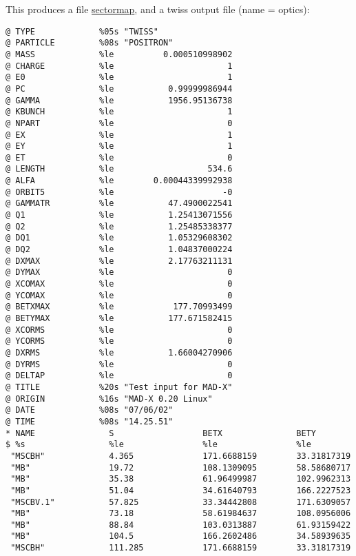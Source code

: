 This produces a file \href{sectormap.html}{sectormap}, and a
\href{tfs}{}twiss output file (name = optics):  
\begin{verbatim}
@ TYPE             %05s "TWISS"
@ PARTICLE         %08s "POSITRON"
@ MASS             %le          0.000510998902
@ CHARGE           %le                       1
@ E0               %le                       1
@ PC               %le           0.99999986944
@ GAMMA            %le           1956.95136738
@ KBUNCH           %le                       1
@ NPART            %le                       0
@ EX               %le                       1
@ EY               %le                       1
@ ET               %le                       0
@ LENGTH           %le                   534.6
@ ALFA             %le        0.00044339992938
@ ORBIT5           %le                      -0
@ GAMMATR          %le           47.4900022541
@ Q1               %le           1.25413071556
@ Q2               %le           1.25485338377
@ DQ1              %le           1.05329608302
@ DQ2              %le           1.04837000224
@ DXMAX            %le           2.17763211131
@ DYMAX            %le                       0
@ XCOMAX           %le                       0
@ YCOMAX           %le                       0
@ BETXMAX          %le            177.70993499
@ BETYMAX          %le           177.671582415
@ XCORMS           %le                       0
@ YCORMS           %le                       0
@ DXRMS            %le           1.66004270906
@ DYRMS            %le                       0
@ DELTAP           %le                       0
@ TITLE            %20s "Test input for MAD-X"
@ ORIGIN           %16s "MAD-X 0.20 Linux"
@ DATE             %08s "07/06/02"
@ TIME             %08s "14.25.51"
* NAME               S                  BETX               BETY               
$ %s                 %le                %le                %le                
 "MSCBH"             4.365              171.6688159        33.31817319       
 "MB"                19.72              108.1309095        58.58680717       
 "MB"                35.38              61.96499987        102.9962313       
 "MB"                51.04              34.61640793        166.2227523       
 "MSCBV.1"           57.825             33.34442808        171.6309057       
 "MB"                73.18              58.61984637        108.0956006       
 "MB"                88.84              103.0313887        61.93159422       
 "MB"                104.5              166.2602486        34.58939635       
 "MSCBH"             111.285            171.6688159        33.31817319       

\end{verbatim}
